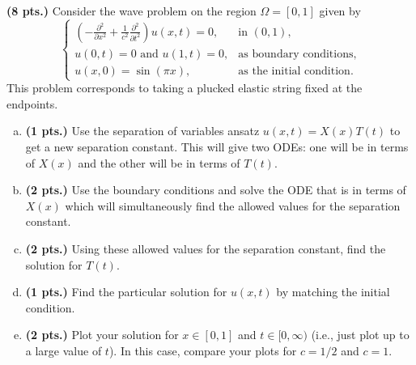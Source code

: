 \documentclass[12pt]{article} %
\begin{document}
\newpage
\begin{problem}
    \textbf{(8 pts.)} Consider the wave problem on the region $\Omega=[0,1]$ given by
    \[
    \begin{cases}
    \left( - \frac{\partial^2}{\partial x^2} +\frac{1}{c^2} \frac{\partial^2}{\partial t^2} \right) u(x,t) =0, & \textrm{in $(0,1)$},\\
    u(0,t)=0 \textrm{~and~} u(1,t)=0, &\textrm{as boundary conditions},\\
    u(x,0)=\sin(\pi x), &\textrm{as the initial condition}.
    \end{cases}
    \]
    This problem corresponds to taking a plucked elastic string fixed at the endpoints.
    \begin{enumerate}[(a)]
        \item \textbf{(1 pts.)} Use the separation of variables ansatz $u(x,t)=X(x)T(t)$ to get a new separation constant. This will give two ODEs: one will be in terms of $X(x)$ and the other will be in terms of $T(t)$.
        \item \textbf{(2 pts.)} Use the boundary conditions and solve the ODE that is in terms of $X(x)$ which will simultaneously find the allowed values for the separation constant.
        \item \textbf{(2 pts.)} Using these allowed values for the separation constant, find the solution for $T(t)$.
        \item \textbf{(1 pts.)} Find the particular solution for $u(x,t)$ by matching the initial condition.
        \item \textbf{(2 pts.)} Plot your solution for $x\in [0,1]$ and $t\in [0,\infty)$ (i.e., just plot up to a large value of $t$). In this case, compare your plots for $c=1/2$ and $c=1$.
    \end{enumerate}
\end{problem}
\end{document}
